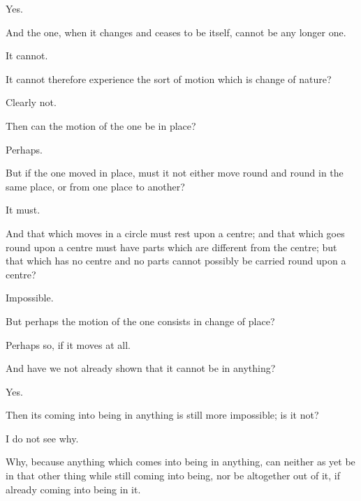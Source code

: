 \documentclass[11pt,letter]{article}
\begin{document}
\par  Yes.

\par  And the one, when it changes and ceases to be itself, cannot be any longer one.

\par  It cannot.

\par  It cannot therefore experience the sort of motion which is change of nature?

\par  Clearly not.

\par  Then can the motion of the one be in place?

\par  Perhaps.

\par  But if the one moved in place, must it not either move round and round in the same place, or from one place to another?

\par  It must.

\par  And that which moves in a circle must rest upon a centre; and that which goes round upon a centre must have parts which are different from the centre; but that which has no centre and no parts cannot possibly be carried round upon a centre?

\par  Impossible.

\par  But perhaps the motion of the one consists in change of place?

\par  Perhaps so, if it moves at all.

\par  And have we not already shown that it cannot be in anything?

\par  Yes.

\par  Then its coming into being in anything is still more impossible; is it not?

\par  I do not see why.

\par  Why, because anything which comes into being in anything, can neither as yet be in that other thing while still coming into being, nor be altogether out of it, if already coming into being in it.
\end{document}
